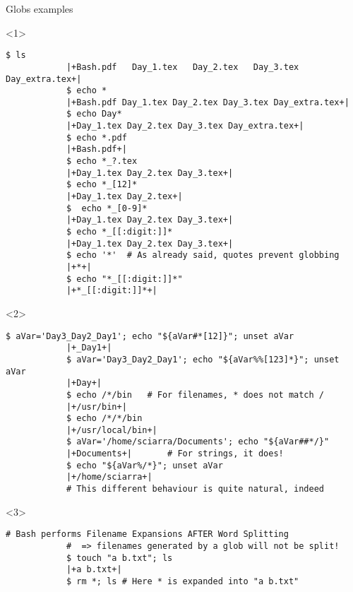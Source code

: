 \begin{frame}[fragile]{Globs examples}
    \vspace{-2mm}
    \begin{onlyenv}<1>
        \begin{lstlisting}[style=MyBash, style=oddnumbers, xleftmargin=3mm, xrightmargin=3mm]
            $ ls
            |+Bash.pdf   Day_1.tex   Day_2.tex   Day_3.tex   Day_extra.tex+|
            $ echo *
            |+Bash.pdf Day_1.tex Day_2.tex Day_3.tex Day_extra.tex+|
            $ echo Day*
            |+Day_1.tex Day_2.tex Day_3.tex Day_extra.tex+|
            $ echo *.pdf
            |+Bash.pdf+|
            $ echo *_?.tex
            |+Day_1.tex Day_2.tex Day_3.tex+|
            $ echo *_[12]*
            |+Day_1.tex Day_2.tex+|
            $  echo *_[0-9]*
            |+Day_1.tex Day_2.tex Day_3.tex+|
            $ echo *_[[:digit:]]*
            |+Day_1.tex Day_2.tex Day_3.tex+|
            $ echo '*'  # As already said, quotes prevent globbing
            |+*+|
            $ echo "*_[[:digit:]]*"
            |+*_[[:digit:]]*+|
        \end{lstlisting}
    \end{onlyenv}
    \begin{onlyenv}<2>
        \begin{lstlisting}[style=MyBash, style=oddnumbers, xleftmargin=3mm, xrightmargin=3mm, firstnumber=20]
            $ aVar='Day3_Day2_Day1'; echo "${aVar#*[12]}"; unset aVar
            |+_Day1+|
            $ aVar='Day3_Day2_Day1'; echo "${aVar%%[123]*}"; unset aVar
            |+Day+|
            $ echo /*/bin   # For filenames, * does not match /
            |+/usr/bin+|
            $ echo /*/*/bin
            |+/usr/local/bin+|
            $ aVar='/home/sciarra/Documents'; echo "${aVar##*/}"
            |+Documents+|       # For strings, it does!
            $ echo "${aVar%/*}"; unset aVar
            |+/home/sciarra+|
            # This different behaviour is quite natural, indeed
        \end{lstlisting}
    \end{onlyenv}
    \begin{onlyenv}<3>
        \begin{lstlisting}[style=MyBash, style=oddnumbers, xleftmargin=3mm, xrightmargin=3mm, firstnumber=32]
            # Bash performs Filename Expansions AFTER Word Splitting
            #  => filenames generated by a glob will not be split!
            $ touch "a b.txt"; ls
            |+a b.txt+|
            $ rm *; ls # Here * is expanded into "a b.txt"

\end{lstlisting}
\end{onlyenv}
\end{frame}
